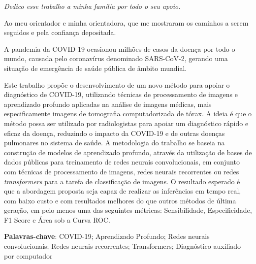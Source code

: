 \begin{flushright}
{\em 
    Dedico esse trabalho a minha família por todo o seu apoio.
}
\end{flushright}
\newpage


\hspace{5mm}
Ao meu orientador e minha orientadora, que me mostraram os caminhos a serem seguidos e pela confiança depositada.



\begin{resumo}


A pandemia da COVID-19 ocasionou milhões de casos da doença por todo o mundo, causada pelo coronavírus denominado SARS-CoV-2, gerando uma situação de emergência de saúde pública de âmbito mundial. 

Este trabalho propõe o desenvolvimento de um novo método para apoiar o diagnóstico de COVID-19, utilizando técnicas de processamento de imagens e aprendizado profundo aplicadas na análise de imagens médicas, mais especificamente imagens de tomografia computadorizada de tórax. A ideia é que o método possa ser utilizado por radiologistas para apoiar um diagnóstico rápido e eficaz da doença, reduzindo o impacto da COVID-19 e de outras doenças pulmonares no sistema de saúde. A metodologia do trabalho se baseia na construção de modelos  de aprendizado profundo, através da utilização de bases de dados públicas para treinamento de redes neurais convolucionais, em conjunto com técnicas de processamento de imagens, redes neurais recorrentes ou redes \textit{transformers} para a tarefa de classificação de imagens. O resultado esperado é que a abordagem proposta seja capaz de realizar as inferências em tempo real, com baixo custo e com resultados melhores do que outros métodos de última geração, em pelo menos uma das seguintes métricas: Sensibilidade, Especificidade, F1 Score e Área sob a Curva ROC.

{\hspace{-8mm} \bf{Palavras-chave}}: COVID-19; Aprendizado Profundo; Redes neurais convolucionais; Redes neurais recorrentes; Transformers; Diagnóstico auxiliado por computador

\end{resumo}

